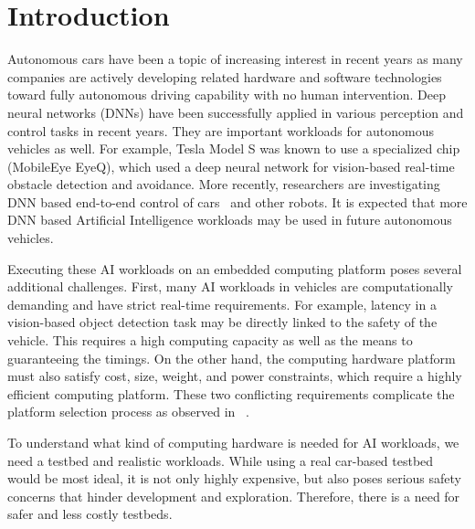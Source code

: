 \section{Introduction} \label{sec:intro}

%
%
Autonomous cars have been a topic of increasing interest in recent
years as many companies are actively developing related hardware
and software technologies toward fully autonomous driving capability with
no human intervention. Deep neural networks (DNNs) have been
successfully applied in various perception and control tasks in
recent years.  They are important workloads for autonomous vehicles
as well. For example, Tesla Model S was known to use a specialized
chip (MobileEye EyeQ), which used a deep neural network for vision-based
real-time obstacle detection and avoidance. More recently, researchers
are investigating DNN based end-to-end control of
cars~\cite{Bojarski2016} and other robots. It is expected that more
DNN based Artificial Intelligence workloads may be used in future
autonomous vehicles.

Executing these AI workloads on an embedded computing platform 
poses several additional challenges. First, many AI workloads in vehicles 
are computationally demanding and have strict real-time requirements. 
For example, latency in a vision-based object
detection task may be directly linked to the safety of the vehicle. This
requires a high computing capacity as well as the means to guaranteeing
the timings. On the other hand, the computing hardware platform must
also satisfy cost, size, weight, and power constraints, which require a
highly efficient computing platform. These two conflicting
requirements complicate the platform selection process as observed in
~\cite{Otterness2017}.


To understand what kind of computing hardware is needed for AI
workloads, we need a testbed and realistic workloads. While using a
real car-based testbed would be most ideal, it is not only highly
expensive, but also poses serious safety concerns that hinder
development and exploration. Therefore, there is a need for safer and
less costly testbeds.

